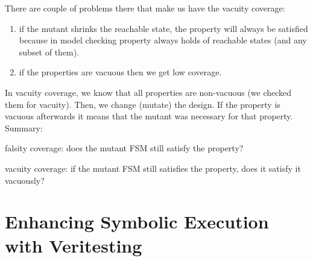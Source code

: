 There are couple of problems there that make us have the vacuity coverage:
\begin{enumerate}
  \item if the mutant shrinks the reachable state, the property will always be satisfied because
  in model checking property always holds of reachable states (and any subset of them).
  \item if the properties are vacuous then we get low coverage.
\end{enumerate}

In vacuity coverage, we know that all properties are non-vacuous (we checked them for vacuity). Then, we change (mutate)
the design. If the property is vacuous afterwards it means that the mutant was necessary for that property.
\linebreak
\linebreak
Summary:

falsity coverage: does the mutant FSM still satisfy the property?

vacuity coverage: if the mutant FSM still satisfies the property, does it satisfy it vacuously?

\section{Enhancing Symbolic Execution with Veritesting \cite{avgerinos2014}}

